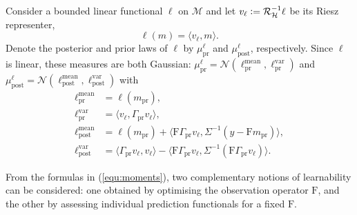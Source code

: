 \documentclass[ba]{imsart}
\theoremstyle{plain}
\newcommand{\defeq}{\vcentcolon=}
\newcommand{\GM}[2]{\mathcal{N}\!\left( {#1}, {#2}\right)}
\newcommand{\obs}{{y}}
\newcommand{\prcov}{\Gamma_{\mathrm{pr}}}
\newcommand{\F}{\mathrm{F}}
\newcommand{\dpar}{{m}}
\newcommand{\dparpr}{\dpar_{\mathrm{pr}}}
\newcommand{\priorml}{\mu_{\mathrm{pr}}^\ell}
\newcommand{\postml}{\mu_{\mathrm{post}}^\ell}
\newcommand{\ip}[2]{\langle {#1}, {#2}\rangle}
\newcommand{\lprmean}{\ell_\text{pr}^\text{mean}}
\newcommand{\lprsig}{\ell_\text{pr}^\text{var}}
\newcommand{\lpostmean}{\ell_\text{post}^\text{mean}}
\newcommand{\lpostsig}{\ell_\text{post}^\text{var}}
\newcommand{\Gammay}{\Sigma}
\newcommand{\hilb}{\mathcal{H}}
\newcommand{\M}{\mathcal{M}}
\newcommand{\RR}{\mathcal{R}}
\begin{document}
Consider a bounded linear functional $\ell$ on $\M$ and let 
$v_\ell \defeq \RR_\hilb^{-1}\ell$ be its Riesz representer,
\begin{equation}\label{equ:functional}
    \ell(\dpar)
    =
    \ip{v_\ell}{\dpar}.
\end{equation}
Denote the posterior and prior laws of $\ell$ by
$\priorml$ and $\postml$, respectively.
Since $\ell$ is linear, these measures are both Gaussian: 
$\priorml = \GM{\lprmean}{\lprsig}$ and $\postml = \GM{\lpostmean}{\lpostsig}$ 
with 
\begin{subequations}\label{equ:moments}
\begin{align}
\lprmean &= \ell(\dparpr),\\
\lprsig &= \ip{v_\ell}{\prcov v_\ell},\\
    \lpostmean 
        &= \ell(\dparpr) + \ip{\F\prcov v_\ell}{\Gammay^{-1} (\obs-\F\dparpr)},\\
    \lpostsig 
        &= \ip{\prcov  v_\ell}{v_\ell} - \ip{\F\prcov v_\ell}{\Gammay^{-1}(\F\prcov v_\ell)}.
\end{align}
\end{subequations}

From the formulas in  (\ref{equ:moments}), two complementary notions of learnability can be considered: one obtained by optimising the observation operator $\F$, and the other by assessing individual prediction functionals for a fixed $\F$.
\end{document}
